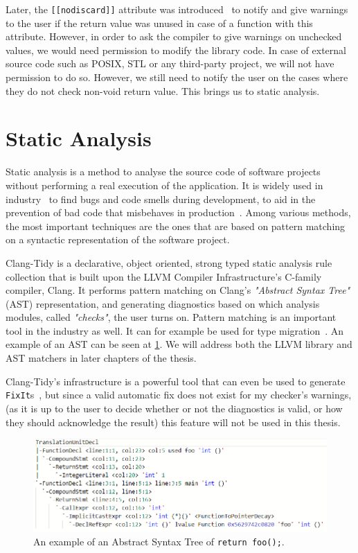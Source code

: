Later, the \texttt{[[nodiscard]]} attribute was introduced~\cite{cppreferencenodiscard} to notify and give warnings to
the user if the return value was unused in case of a function
with this attribute. However, in order to ask the compiler to give warnings on unchecked values, we would need permission to modify the library code.
In case of external source code such as POSIX, STL or any third-party project, we will not have permission to do so.
However, we still need to notify the user on the cases where they do not check non-void return value. This brings us to static analysis.

\section{Static Analysis}

Static analysis is a method to analyse the source code of software projects without performing a real execution of the application.
It is widely used in industry~\cite{statcompare}
to find bugs and code smells during development, to aid in the prevention of bad code that misbehaves in
production~\cite{selectiondef}.
Among various methods, the most important techniques are the ones that are based on pattern matching on a syntactic representation of
the software project.

Clang-Tidy is a declarative, object oriented, strong typed static analysis rule collection that is built upon the LLVM Compiler
Infrastructure's C-family compiler, Clang.
It performs pattern matching on Clang's \emph{"Abstract Syntax Tree"} (AST) representation, and generating diagnostics based on which
analysis modules, called \emph{"checks"}, the user turns on. Pattern matching is an important tool in the industry as well. It can for
example be used for type migration~\cite{typemig}. An example of an AST can be seen at \cref{fig:ast1}.
We will address both the LLVM library and AST matchers in later chapters of the thesis.

Clang-Tidy's infrastructure is a powerful tool that can even be used to generate \lstinline{FixIt}s~\cite{autorefact}, but since a
valid automatic fix does not exist for my checker's warnings, (as it is up to the user to decide whether or not the diagnostics is
valid, or how they should acknowledge the result) this feature will not be used in this thesis.  


\begin{figure}[H]
    \includegraphics[width=\linewidth]{images/return_foo_ast.png}
	\caption{An example of an Abstract Syntax Tree of \texttt{return foo();}.}
    \label{fig:ast1}
\end{figure}

